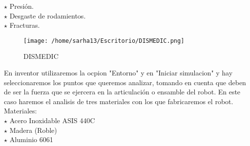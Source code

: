 \documentclass[letter,openright,12pt,spanish]{report}
\begin{document}
$\star$ Presi\'on.\\

$\star$ Desgaste de rodamientos.\\

$\star$ Fracturas.\\

\begin{figure}[htp]
\centering
\texttt{[image: /home/sarha13/Escritorio/DISMEDIC.png]}
\caption{DISMEDIC}
\label{Figura 1}
\end{figure}

En inventor utilizaremos la ocpion "Entorno" y en "Iniciar simulacion" y hay seleccionaremos los puntos que queremos analizar, tomando en cuenta que deben de ser la fuerza que se ejercera en la articulaci\'on o ensamble del robot. En este caso haremos el analisis de tres materiales con los que fabricaremos el robot.\\

Materiales: \\

$\star$ Acero Inoxidable ASIS 440C\\

$\star$ Madera (Roble)\\

$\star$ Aluminio 6061\\
\end{document}
